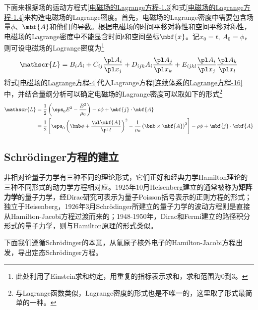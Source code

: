 下面来根据场的运动方程式\eqref{电磁场的Lagrange方程-1.3}和式\eqref{电磁场的Lagrange方程-1.4}来构造电磁场的Lagrange密度。首先，电磁场的Lagrange密度中需要包含场量$\phi$、$\mbf{A}$和他们的导数。根据电磁场的时间平移对称性和空间平移对称性，电磁场的Lagrange密度中不能显含时间$t$和空间坐标$\mbf{x}$。记$x_0 = t,~A_0 = \phi$，则可设电磁场的Lagrange密度为\footnote{此处利用了Einstein求和约定，用重复的指标表示求和，求和范围为$0$到$3$。}
\begin{equation}
	\mathscr{L} = B_iA_i+ C_{ij}\frac{\pl A_i}{\pl x_j} + D_{ijk}A_i\frac{\pl A_j}{\pl x_k} + E_{ijkl} \frac{\pl A_i}{\pl x_j}\frac{\pl A_k}{\pl x_l}
	\label{电磁场的Lagrange方程-4}
\end{equation}
将式\eqref{电磁场的Lagrange方程-4}代入Lagrange方程\eqref{连续体系的Lagrange方程-16}中，并结合量纲分析可以确定电磁场的Lagrange密度可以取如下的形式\footnote{与Lagrange函数类似，Lagrange密度的形式也是不唯一的，这里取了形式最简单的一种。}
\begin{align}
	\mathscr{L} & = \frac12 \left(\eps_0E^2-\frac{B^2}{\mu_0}\right) - \rho \phi + \mbf{j}\cdot \mbf{A} \nonumber \\
	& = \frac12 \left[\eps_0\left(\bnb\phi+\frac{\pl \mbf{A}}{\pl t}\right)^2-\frac{1}{\mu_0}\left(\bnb \times \mbf{A}\right)^2\right] - \rho \phi + \mbf{j}\cdot \mbf{A}
	\label{电磁场的Lagrange方程-5}
\end{align}

\subsection{Schr\"{o}dinger方程的建立}

非相对论量子力学有三种不同的理论形式，它们正好和经典力学Hamilton理论的三种不同形式的动力学方程相对应。1925年10月Heisenberg建立的通常被称为{\bf 矩阵力学}的量子力学，经Dirac研究可表示为量子Poisson括号表示的正则方程的形式；独立于Heisenberg，1926年3月Schr\"{o}dinger所建立的量子力学的波动方程则是直接从Hamilton-Jacobi方程过渡而来的；1948-1950年，Dirac和Fermi建立的路径积分形式的量子力学，则与Hamilton原理的形式类似。

下面我们遵循Schr\"{o}dinger的本意，从氢原子核外电子的Hamilton-Jacobi方程出发，导出定态Schr\"{o}dinger方程。

